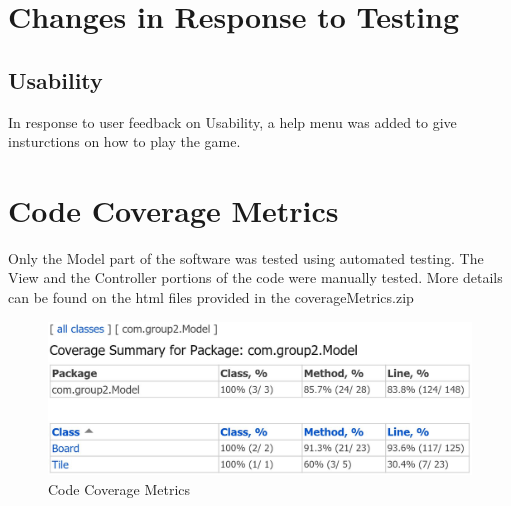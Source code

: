\documentclass[12pt]{article}
\begin{document}
\section{Changes in Response to Testing}
\subsection{Usability}
In response to user feedback on Usability, a help menu was added to give insturctions on how to play the game.

\section{Code Coverage Metrics}
Only the Model part of the software was tested using automated testing. The View and the Controller portions of the code were manually tested. More details can be found on the html files provided in the coverageMetrics.zip

\begin{figure}[H]
	\centering
	\includegraphics[width = 14cm]{Code_Coverage}
	\caption{Code Coverage Metrics}
	\label{Code Coverage Metrics}
\end{figure}
\end{document}
